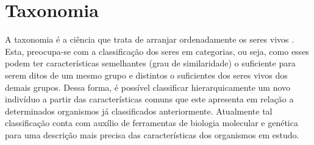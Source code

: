 \documentclass[tcc2]{classe_uftex/uftex}
\begin{document}
\section{Taxonomia}
\label{sec:taxonomia}
A taxonomia é a ciência que trata de arranjar ordenadamente os seres vivos \cite{2017:Tortora}. Esta,  preocupa-se com a classificação dos seres em categorias, ou seja, como esses podem ter características semelhantes (grau de similaridade) o suficiente para serem ditos de um mesmo grupo e distintos o suficientes dos seres vivos dos demais grupos. Dessa forma, é possível classificar hierarquicamente um novo indivíduo a partir das características comuns que este apresenta em relação a determinados organismos já classificados anteriormente. Atualmente tal classificação conta com auxílio de ferramentas de biologia molecular e genética para uma descrição mais precisa das características dos organismos em estudo.
\end{document}
